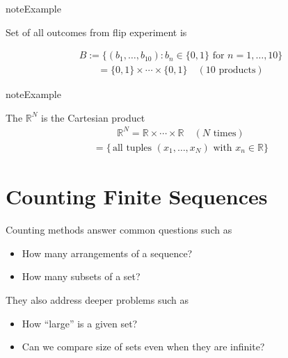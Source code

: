 \documentclass[letterpaper,10pt,english]{jupyterBook}
\begin{document}
\begin{sphinxadmonition}{note}{Example}

\sphinxAtStartPar
Set of all outcomes from flip experiment is
\end{sphinxadmonition}
\begin{equation*}
\begin{split}
B := \Big\{ (b_1, \ldots, b_{10}) : b_n \in \{0, 1\} \text{ for } n = 1, \ldots, 10 \Big\}
\end{split}
\end{equation*}\begin{equation*}
\begin{split}
= \{0, 1\} \times \cdots \times \{0, 1\} \quad (10 \text{ products})
\end{split}
\end{equation*}
\begin{sphinxadmonition}{note}{Example}

\sphinxAtStartPar
The  \(\mathbb{R}^N\) is the Cartesian product
\begin{equation*}
\begin{split}
\mathbb{R}^N = \mathbb{R} \times \cdots \times \mathbb{R} \quad (N \text{ times})
\end{split}
\end{equation*}\begin{equation*}
\begin{split}
= \{ 
\, \text{all tuples } (x_1, \ldots, x_N) \text{ with } x_n \in \mathbb{R}
\}
\end{split}
\end{equation*}\end{sphinxadmonition}


\section{Counting Finite Sequences}
\label{\detokenize{03.set_theory:counting-finite-sequences}}
\sphinxAtStartPar
Counting methods answer common questions such as
\begin{itemize}
\item {} 
\sphinxAtStartPar
How many arrangements of a sequence?

\item {} 
\sphinxAtStartPar
How many subsets of a set?

\end{itemize}

\sphinxAtStartPar
They also address deeper problems such as
\begin{itemize}
\item {} 
\sphinxAtStartPar
How “large” is a given set?

\item {} 
\sphinxAtStartPar
Can we compare size of sets even when they are infinite?

\end{itemize}
\end{document}
